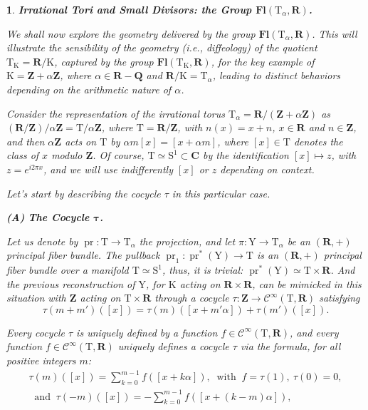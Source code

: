 \documentclass[10pt,letterpaper,reqno]{amsart}
\theoremstyle{article}
\newtheorem{article}[subsection]{}
\def\artlabel[#1]{{\textbf{#1}}}
\newenvironment{proposition*}{\textbf{Proposition.}\it}{}
\newcommand{\1}{{\hat 1}}
\newcommand{\0}{{\hat 0}}
\newcommand{\CC}{\mathbf C}
\newcommand{\QQ}{\mathbf Q}
\newcommand{\RR}{\mathbf R}
\newcommand{\ZZ}{\mathbf Z}
\def \K{\mathrm K}
\def \S{\mathrm S}
\def \T{\mathrm T}
\def \Y{\mathrm Y}
\newcommand{\cl}[1]{\left[ #1 \right]}
\newcommand{\Cinfty}{\mathcal{C}^\infty}
\DeclareMathOperator{\Fb}{\boldsymbol{\mathsf{Fl}}}
\newcommand{\Ka}{\K}
\newcommand{\pr}{\operatorname{pr}}
\renewcommand{\Fb}{\mathbf{Fl}}
\begin{document}
  \begin{article}
    \artlabel[Irrational Tori and Small Divisors: the Group $\Fb(\T_\alpha,\RR)$.]
    \label{Irrational-Tori-and-Small-Divisors}
    
    We shall now explore the geometry delivered by the group $\Fb(\T_\alpha,\RR)$.
    This will illustrate the sensibility of the geometry (i.e., diffeology) of the quotient $\T_\Ka = \RR/\Ka$,
    captured by the group $\Fb(\T_\Ka,\RR)$,
    for the key example of $\Ka = \ZZ + \alpha \ZZ$,
    where $\alpha \in \RR - \QQ$ and $\RR/\Ka = \T_\alpha$,
    leading to distinct behaviors depending on the arithmetic nature of $\alpha$.
    
    Consider the representation of the irrational torus $\T_\alpha = \RR/(\ZZ + \alpha \ZZ)$ as $(\RR/\ZZ)/\alpha\ZZ = \T/\alpha\ZZ$,
    where $\T = \RR/\ZZ$,
    with $n(x) = x + n$, $x \in \RR$ and $n \in \ZZ$,
    and then $\alpha\ZZ$ acts on $\T$ by $\alpha m \cl{x} = \cl{ x + \alpha m}$,
    where $\cl{x} \in \T$ denotes the class of $x$ modulo $\ZZ$.
    Of course,
    $\T \simeq \S^1 \subset \CC$ by the identification $\cl{x} \mapsto z$,
    with $z = e^{i2\pi x}$,
    and we will use indifferently $\cl{x}$ or $z$ depending on context.
    
    Let's start by describing the cocycle $\tau$ in this particular case.
    
    \smallskip\textbf{(A)} \textbf{The Cocycle $\boldsymbol\tau$.}
    
    Let us denote by $\pr : \T \to \T_\alpha$ the projection,
    and let $\pi : \Y \to \T_\alpha$ be an $(\RR,+)$ principal fiber bundle.
    The pullback $\pr_1 : \pr^*(\Y) \to \T$ is an $(\RR,+)$ principal fiber bundle over a manifold $\T \simeq \S^1$,
    thus,
    it is trivial:
    $\pr^*(\Y) \simeq \T \times \RR$.
    And the previous reconstruction of $\Y$,
    for $\Ka$ acting on $\RR \times \RR$,
    can be mimicked in this situation with $\ZZ$ acting on $\T \times \RR$ through a cocycle $\tau : \ZZ \to \Cinfty(\T,\RR)$ satisfying
    $$%
      \tau(m + m')(\cl{x}) = \tau(m)(\cl{x + m'\alpha}) + \tau(m')(\cl{x}).
      $$%
    \begin{proposition*}
      Every cocycle $\tau$ is uniquely defined by a function $f \in \Cinfty(\T,\RR)$,
      and every function $f \in \Cinfty(\T,\RR)$ uniquely defines a cocycle $\tau$ via the formula,
      for all positive integers $m$:
      \begin{multline}\tag{$\clubsuit$}
        \label{Cocycle-tau-alpha}
        \tau(m)(\cl{x}) = \sum_{k=0}^{m-1} f(\cl{x+k\alpha}),
        \ \text{ with } \
        f = \tau(1), \ \tau(0) = 0, \\
        \ \text{ and } \
        \tau(-m)(\cl{x}) = - \sum_{k=0}^{m-1} f(\cl{x+(k-m)\alpha}),
      \end{multline}
    \end{proposition*}
    

\end{article}
\end{document}
